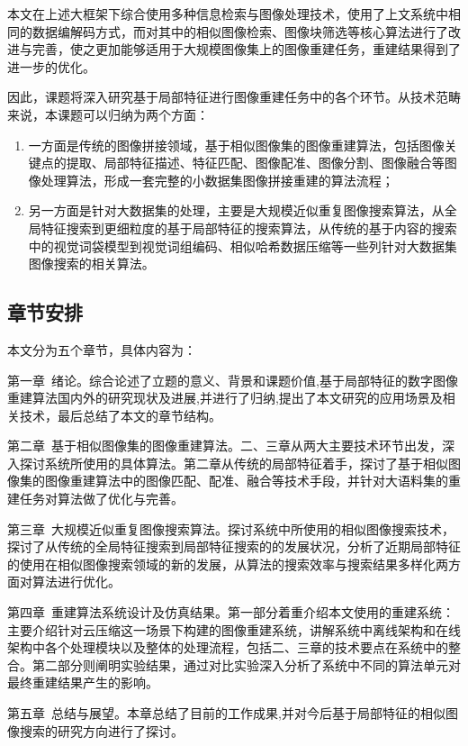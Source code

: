 本文在上述大框架下综合使用多种信息检索与图像处理技术，使用了上文系统中相同的数据编解码方式，而对其中的相似图像检索、图像块筛选等核心算法进行了改进与完善，使之更加能够适用于大规模图像集上的图像重建任务，重建结果得到了进一步的优化。

因此，课题将深入研究基于局部特征进行图像重建任务中的各个环节。从技术范畴来说，本课题可以归纳为两个方面：

\begin{enumerate}
\item 一方面是传统的图像拼接领域，基于相似图像集的图像重建算法，包括图像关键点的提取、局部特征描述、特征匹配、图像配准、图像分割、图像融合等图像处理算法，形成一套完整的小数据集图像拼接重建的算法流程；
\item 另一方面是针对大数据集的处理，主要是大规模近似重复图像搜索算法，从全局特征搜索到更细粒度的基于局部特征的搜索算法，从传统的基于内容的搜索中的视觉词袋模型到视觉词组编码、相似哈希数据压缩等一些列针对大数据集图像搜索的相关算法。
\end{enumerate}


\subsection{章节安排}
本文分为五个章节，具体内容为：

第一章\ 绪论。综合论述了立题的意义、背景和课题价值,基于局部特征的数字图像重建算法国内外的研究现状及进展,并进行了归纳,提出了本文研究的应用场景及相关技术，最后总结了本文的章节结构。

第二章\ 基于相似图像集的图像重建算法。二、三章从两大主要技术环节出发，深入探讨系统所使用的具体算法。第二章从传统的局部特征着手，探讨了基于相似图像集的图像重建算法中的图像匹配、配准、融合等技术手段，并针对大语料集的重建任务对算法做了优化与完善。

第三章\ 大规模近似重复图像搜索算法。探讨系统中所使用的相似图像搜索技术，探讨了从传统的全局特征搜索到局部特征搜索的的发展状况，分析了近期局部特征的使用在相似图像搜索领域的新的发展，从算法的搜索效率与搜索结果多样化两方面对算法进行优化。

第四章\ 重建算法系统设计及仿真结果。第一部分着重介绍本文使用的重建系统：主要介绍针对云压缩这一场景下构建的图像重建系统，讲解系统中离线架构和在线架构中各个处理模块以及整体的处理流程，包括二、三章的技术要点在系统中的整合。第二部分则阐明实验结果，通过对比实验深入分析了系统中不同的算法单元对最终重建结果产生的影响。

第五章\ 总结与展望。本章总结了目前的工作成果,并对今后基于局部特征的相似图像搜索的研究方向进行了探讨。

\ifx\usechapbib\empty
\nocite{BSTcontrol}


\fi
